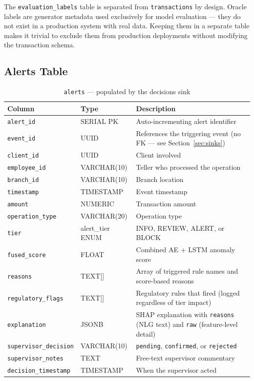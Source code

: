 The \texttt{evaluation\_labels} table is separated from \texttt{transactions}
by design. Oracle labels are generator metadata used exclusively for model
evaluation --- they do not exist in a production system with real data. Keeping
them in a separate table makes it trivial to exclude them from production
deployments without modifying the transaction schema.

\subsection{Alerts Table}

\begin{table}[H]
\centering
\caption{\texttt{alerts} --- populated by the decisions sink}
\label{tab:alerts-table}
\begin{tabularx}{\textwidth}{@{}llX@{}}
\toprule
\textbf{Column} & \textbf{Type} & \textbf{Description} \\
\midrule
\texttt{alert\_id}            & SERIAL PK    & Auto-incrementing alert identifier \\
\texttt{event\_id}            & UUID         & References the triggering event (no FK --- see Section~\ref{sec:sinks}) \\
\texttt{client\_id}           & UUID         & Client involved \\
\texttt{employee\_id}         & VARCHAR(10)  & Teller who processed the operation \\
\texttt{branch\_id}           & VARCHAR(10)  & Branch location \\
\texttt{timestamp}            & TIMESTAMP    & Event timestamp \\
\texttt{amount}               & NUMERIC      & Transaction amount \\
\texttt{operation\_type}      & VARCHAR(20)  & Operation type \\
\texttt{tier}                 & alert\_tier ENUM & INFO, REVIEW, ALERT, or BLOCK \\
\texttt{fused\_score}         & FLOAT        & Combined AE + LSTM anomaly score \\
\texttt{reasons}              & TEXT[]       & Array of triggered rule names and score-based reasons \\
\texttt{regulatory\_flags}    & TEXT[]       & Regulatory rules that fired (logged regardless of tier impact) \\
\texttt{explanation}          & JSONB        & SHAP explanation with \texttt{reasons} (NLG text) and \texttt{raw} (feature-level detail) \\
\texttt{supervisor\_decision} & VARCHAR(10)  & \texttt{pending}, \texttt{confirmed}, or \texttt{rejected} \\
\texttt{supervisor\_notes}    & TEXT         & Free-text supervisor commentary \\
\texttt{decision\_timestamp}  & TIMESTAMP    & When the supervisor acted \\
\bottomrule
\end{tabularx}
\end{table}

